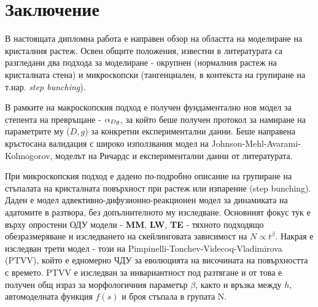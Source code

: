 \section{Заключение}
В настоящата дипломна работа е направен обзор на областта на моделиране на кристалния растеж. Освен общите положения, известни в литературата са разгледани два подхода за моделиране - окрупнен (нормалния растеж на кристалната стена) и микроскопски (тангенциален, в контекста на групиране на т.нар. \textit{step bunching}).

В рамките на макроскопския подход е получен фундаментално нов модел за степента на превръщане - $\alpha_{Dg}$, за който беше получен протокол за намиране на параметрите му ($D, g$) за конкретни експериментални данни. Беше направена кръстосана валидация с широко използвания модел на Johnson-Mehl-Avarami-Kolmogorov, моделът на Ричардс и експериментални данни от литературата.

При микроскопския подход е дадено по-подробно описание на групиране на стъпалата на кристалната повърхност при растеж или изпарение (step bunching). Даден е модел адвективно-дифузионно-реакционен модел за динамиката на адатомите в разтвора, без допълнителното му изследване. Основният фокус тук е върху опростени ОДУ модели - \textbf{MM}, \textbf{LW}, \textbf{TE} - тяхното подходящо обезразмеряване и изследването на скейлинговата зависимост на $N \propto t^\beta$. Накрая е изследван трети модел - този на Pimpinelli-Tonchev-Videcoq-Vladimirova (PTVV), който е едномерно ЧДУ за еволюцията на височината на повърхността с времето. PTVV е изследван за инвариантност под разтягане и от това е получен общ израз за морфологичния параметър $\beta$, както и връзка между $h$, автомоделната функция $f(s)$ и броя стъпала в групата N.
